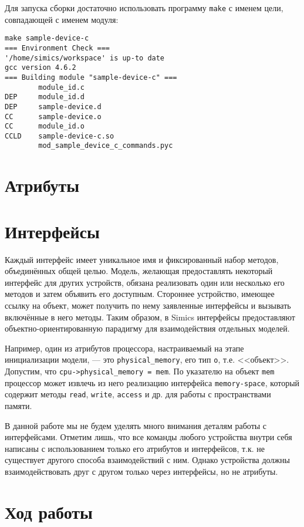 Для запуска сборки достаточно использовать программу \texttt{make} с именем цели, совпадающей с именем модуля:
\begin{lstlisting}
make sample-device-c
=== Environment Check ===
'/home/simics/workspace' is up-to date
gcc version 4.6.2
=== Building module "sample-device-c" ===
        module_id.c
DEP     module_id.d
DEP     sample-device.d
CC      sample-device.o
CC      module_id.o
CCLD    sample-device-c.so
        mod_sample_device_c_commands.pyc
\end{lstlisting}

\section{Атрибуты}

\todo

\section{Интерфейсы}

Каждый интерфейс имеет уникальное имя и фиксированный набор методов, объединённых общей целью. Модель, желающая предоставлять некоторый интерфейс для других устройств, обязана реализовать один или несколько его методов и затем объявить его доступным. Стороннее устройство, имеющее ссылку на объект, может получить по нему заявленные интерфейсы и вызывать включённые в него методы. Таким образом, в Simics интерфейсы предоставляют объектно-ориентированную парадигму для взаимодействия отдельных моделей. 

Например, один из атрибутов процессора, настраиваемый на этапе инициализации модели, --- это \texttt{physical_memory}, его тип \texttt{o}, т.е. <<объект>>. Допустим, что \texttt{cpu->physical_memory = mem}. По указателю на объект \texttt{mem} процессор может извлечь из него реализацию интерфейса \texttt{memory-space}, который содержит методы \texttt{read}, \texttt{write}, \texttt{access} и др. для работы с пространствами памяти.

В данной работе мы не будем уделять много внимания  деталям работы с интерфейсами. Отметим лишь, что все команды любого устройства внутри себя написаны с использованием только его атрибутов и интерфейсов, т.к. не существует другого способа взаимодействий с ним. Однако устройства должны взаимодействовать друг с другом только через интерфейсы, но не атрибуты.


\section{Ход работы}

